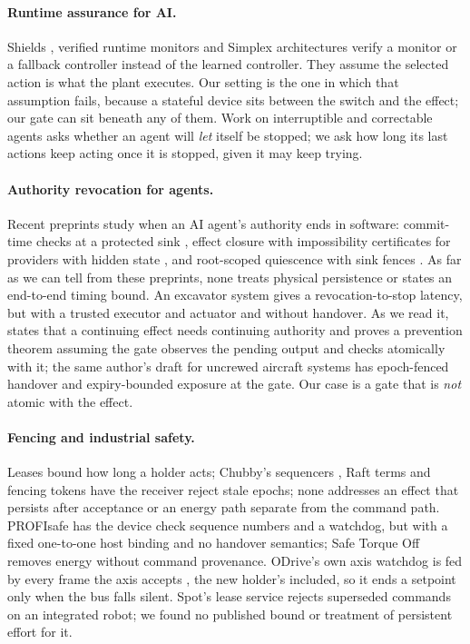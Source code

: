 \documentclass[letterpaper]{article} %
\begin{document}
\paragraph{Runtime assurance for AI.} Shields \citep{alshiekh2018shield}, verified runtime monitors
\citep{mitsch2016modelplex,fulton2018saferl,bohrer2018veriphy} and Simplex architectures
\citep{sha2001simplex,phan2020nsa} verify a monitor or a fallback controller instead of the
learned controller. They assume the selected action is what the plant executes. Our setting is the
one in which that assumption fails, because a stateful device sits between the switch and the
effect; our gate can sit beneath any of them. Work on interruptible and correctable agents
\citep{orseau2016interruptible,hadfield2017offswitch} asks whether an agent will \emph{let} itself
be stopped; we ask how long its last actions keep acting once it is stopped, given it may keep
trying.

\paragraph{Authority revocation for agents.} Recent preprints study when an AI agent's authority
ends in software: commit-time checks at a protected sink
\citep{santosgrueiro2026commit}, effect closure with impossibility certificates for providers
with hidden state \citep{santosgrueiro2026closure}, and root-scoped quiescence with sink fences
\citep{zhu2026revocation}. As far as we can tell from these preprints, none treats physical
persistence or states an end-to-end timing bound. An
excavator system \citep{heydari2026excavator} gives a revocation-to-stop latency, but with a
trusted executor and actuator and without handover. As we read it, \citet{das2026lastgate}
states that a continuing effect needs continuing authority and proves a prevention theorem
assuming the gate observes the pending output and checks atomically with it; the same author's
draft for uncrewed aircraft systems \citep{das2026uas} has epoch-fenced handover and
expiry-bounded exposure at the gate. Our case is a gate that is \emph{not} atomic with the effect.

\paragraph{Fencing and industrial safety.} Leases \citep{gray1989leases} bound how long a holder
acts; Chubby's sequencers \citep{burrows2006chubby}, Raft terms \citep{ongaro2014raft} and
fencing tokens \citep{kleppmann2016locking} have the receiver reject stale epochs; none addresses an effect that
persists after acceptance or an energy path separate from the command path. PROFIsafe
\citep{iec61784} has the device check sequence numbers and a watchdog, but with a fixed one-to-one
host binding and no handover semantics; Safe Torque Off \citep{iec61800} removes energy without
command provenance. ODrive's own axis watchdog is fed by every frame the axis accepts
\citep{odrive}, the new holder's included, so it ends a setpoint only when the bus falls silent.
Spot's lease service \citep{spotlease} rejects superseded commands on an
integrated robot; we found no published bound or treatment of persistent effort for it.
\end{document}
